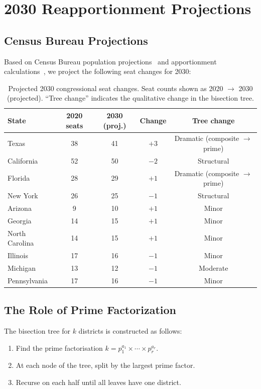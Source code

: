 \section{2030 Reapportionment Projections}
\label{sec:projections}

\subsection{Census Bureau Projections}

Based on Census Bureau population projections~\citep{census2030proj} and
\hh{} apportionment calculations~\citep{huntington1928,balinski1982},
we project the following seat changes for 2030:

\begin{table}[h]
\centering
\caption{Projected 2030 congressional seat changes. Seat counts shown
         as 2020 $\to$ 2030 (projected). ``Tree change'' indicates the
         qualitative change in the \ar{} bisection tree.}
\label{tab:projections}
\begin{tabular}{lcccc}
\toprule
State & 2020 seats & 2030 (proj.) & Change & Tree change \\
\midrule
Texas & 38 & 41 & $+3$ & Dramatic (composite $\to$ prime) \\
California & 52 & 50 & $-2$ & Structural \\
Florida & 28 & 29 & $+1$ & Dramatic (composite $\to$ prime) \\
New York & 26 & 25 & $-1$ & Structural \\
Arizona & 9 & 10 & $+1$ & Minor \\
Georgia & 14 & 15 & $+1$ & Minor \\
North Carolina & 14 & 15 & $+1$ & Minor \\
Illinois & 17 & 16 & $-1$ & Minor \\
Michigan & 13 & 12 & $-1$ & Moderate \\
Pennsylvania & 17 & 16 & $-1$ & Minor \\
\bottomrule
\end{tabular}
\end{table}

\subsection{The Role of Prime Factorization}

The \ar{} bisection tree for $k$ districts is constructed as follows:
\begin{enumerate}
\item Find the prime factorisation $k = p_1^{a_1} \times \cdots \times p_r^{a_r}$.
\item At each node of the tree, split by the largest prime factor.
\item Recurse on each half until all leaves have one district.
\end{enumerate}

